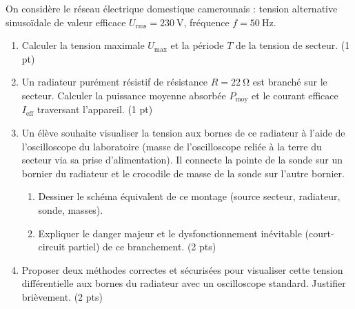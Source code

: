 \documentclass[11pt]{article}
\begin{document}
\begin{exercice}
On considère le réseau électrique domestique camerounais : tension alternative sinusoïdale de valeur efficace $U_{\text{rms}} = \SI{230}{\volt}$, fréquence $f = \SI{50}{\hertz}$.
\begin{enumerate}
    \item Calculer la tension maximale $U_{\text{max}}$ et la période $T$ de la tension de secteur. (1 pt)
    \item Un radiateur purément résistif de résistance $R = \SI{22}{\ohm}$ est branché sur le secteur. Calculer la puissance moyenne absorbée $P_{\text{moy}}$ et le courant efficace $I_{\text{eff}}$ traversant l'appareil. (1 pt)
    \item Un élève souhaite visualiser la tension aux bornes de ce radiateur à l'aide de l'oscilloscope du laboratoire (masse de l'oscilloscope reliée à la terre du secteur via sa prise d'alimentation). Il connecte la pointe de la sonde sur un bornier du radiateur et le crocodile de masse de la sonde sur l'autre bornier.
    \begin{enumerate}
        \item Dessiner le schéma équivalent de ce montage (source secteur, radiateur, sonde, masses). 
        \item Expliquer le danger majeur et le dysfonctionnement inévitable (court-circuit partiel) de ce branchement. (2 pts)
    \end{enumerate}
    \item Proposer deux méthodes correctes et sécurisées pour visualiser cette tension différentielle aux bornes du radiateur avec un oscilloscope standard. Justifier brièvement. (2 pts)
\end{enumerate}
\end{exercice}
\end{document}
